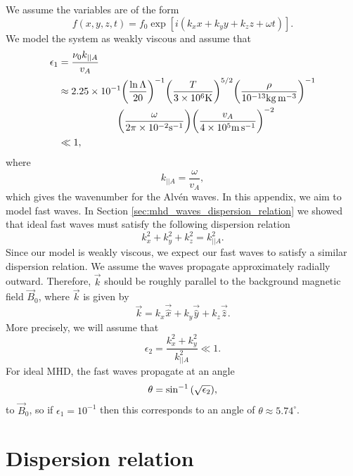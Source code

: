 We assume the variables are of the form
\begin{equation}
    \label{eq:apdx_exp_form}
    f(x,y,z,t) = f_0\exp[i(k_x x + k_y y + k_z z + \omega t)].
\end{equation}
We model the system as weakly viscous and assume that
\begin{equation}
\begin{aligned}
    \epsilon_1 &= \frac{\nu_0 k_{||A}}{v_A} \\
    &\approx 2.25\times10^{-1}\qty(\frac{\ln\Lambda}{20})^{-1}\qty(\frac{T}{3\times 10^6\si{.K}})^{5/2}\qty(\frac{\rho}{10^{-13}\si{.kg.m^{-3}}})^{-1} \\
    & \qquad\qquad\qquad\qty(\frac{\omega}{2\pi\times10^{-2}\si{.s^{-1}}})\qty(\frac{v_A}{4\times10^5\si{.m.s^{-1}}})^{-2} \\
    &\ll 1,
\end{aligned}
\end{equation}
where
\begin{equation}
    k_{||A} = \frac{\omega}{v_A},
\end{equation}
which gives the wavenumber for the Alv\'en waves. In this appendix, we aim to model fast waves. In Section \ref{sec:mhd_waves_dispersion_relation} we showed that ideal fast waves must satisfy the following dispersion relation
\begin{equation}
    k_x^2 + k_y^2 + k_z^2 = k_{||A}^2.
\end{equation}
Since our model is weakly viscous, we expect our fast waves to satisfy a similar dispersion relation. We assume the waves propagate approximately radially outward. Therefore, $\vec{k}$ should be roughly parallel to the background magnetic field $\vec{B}_0$, where $\vec{k}$ is given by
\begin{equation}
    \vec{k} = k_x \vec{\hat{x}} + k_y \vec{\hat{y}} + k_z \vec{\hat{z}}.
\end{equation}
More precisely, we will assume that 
\begin{equation}
    \epsilon_2 = \frac{k_x^2 + k_y^2}{k_{||A}^2} \ll 1.
\end{equation}
For ideal MHD, the fast waves propagate at an angle
\begin{equation}
    \theta = \sin^{-1}\qty(\sqrt{\epsilon_2}),
\end{equation}
to $\vec{B}_0$, so if $\epsilon_1=10^{-1}$ then this corresponds to an angle of $\theta\approx5.74^{\circ}$.

\section{Dispersion relation}

